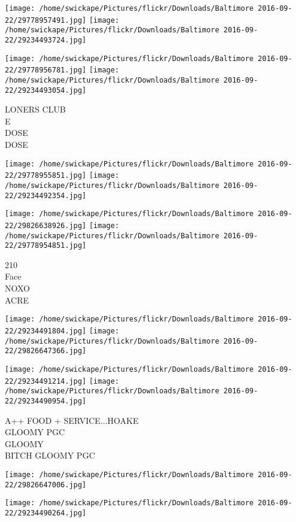 \documentclass[10pt,letterpaper]{article}
\begin{document}
\texttt{[image: /home/swickape/Pictures/flickr/Downloads/Baltimore 2016-09-22/29778957491.jpg]}
\texttt{[image: /home/swickape/Pictures/flickr/Downloads/Baltimore 2016-09-22/29234493724.jpg]}

\texttt{[image: /home/swickape/Pictures/flickr/Downloads/Baltimore 2016-09-22/29778956781.jpg]}
\texttt{[image: /home/swickape/Pictures/flickr/Downloads/Baltimore 2016-09-22/29234493054.jpg]}

LONERS CLUB\\
E\\
DOSE\\
DOSE\\
\pagebreak

\texttt{[image: /home/swickape/Pictures/flickr/Downloads/Baltimore 2016-09-22/29778955851.jpg]}
\texttt{[image: /home/swickape/Pictures/flickr/Downloads/Baltimore 2016-09-22/29234492354.jpg]}

\texttt{[image: /home/swickape/Pictures/flickr/Downloads/Baltimore 2016-09-22/29826638926.jpg]}
\texttt{[image: /home/swickape/Pictures/flickr/Downloads/Baltimore 2016-09-22/29778954851.jpg]}

210\\
Face\\
NOXO\\
ACRE\\
\pagebreak

\texttt{[image: /home/swickape/Pictures/flickr/Downloads/Baltimore 2016-09-22/29234491804.jpg]}
\texttt{[image: /home/swickape/Pictures/flickr/Downloads/Baltimore 2016-09-22/29826647366.jpg]}

\texttt{[image: /home/swickape/Pictures/flickr/Downloads/Baltimore 2016-09-22/29234491214.jpg]}
\texttt{[image: /home/swickape/Pictures/flickr/Downloads/Baltimore 2016-09-22/29234490954.jpg]}

A++ FOOD + SERVICE...HOAKE\\
GLOOMY PGC\\
GLOOMY\\
BITCH GLOOMY PGC\\
\pagebreak

\texttt{[image: /home/swickape/Pictures/flickr/Downloads/Baltimore 2016-09-22/29826647006.jpg]}

\vspace{0.25in}
\texttt{[image: /home/swickape/Pictures/flickr/Downloads/Baltimore 2016-09-22/29234490264.jpg]}
\end{document}
